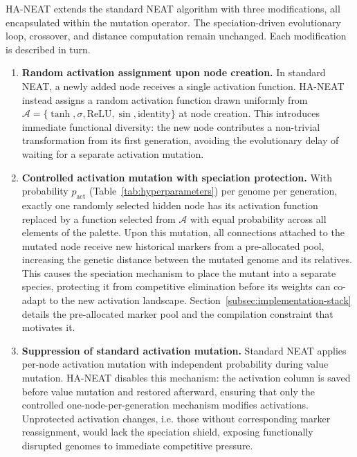\documentclass[12pt]{article}
\begin{document}
HA-NEAT extends the standard NEAT algorithm with three modifications, all encapsulated within the mutation operator.
The speciation-driven evolutionary loop, crossover, and distance computation remain unchanged.
Each modification is described in turn.

\begin{enumerate}
    \item \textbf{Random activation assignment upon node creation.} In standard NEAT, a newly added node receives a single activation function. HA-NEAT instead assigns a random activation function drawn uniformly from $\mathcal{A} = \{\tanh, \sigma, \text{ReLU}, \sin, \text{identity}\}$ at node creation. This introduces immediate functional diversity: the new node contributes a non-trivial transformation from its first generation, avoiding the evolutionary delay of waiting for a separate activation mutation.
    
    \item \textbf{Controlled activation mutation with speciation protection.} With probability $p_{\text{act}}$ (Table~\ref{tab:hyperparameters}) per genome per generation, exactly one randomly selected hidden node has its activation function replaced by a function selected from
    $\mathcal{A}$ with equal probability across all elements of the palette. Upon this mutation, all connections attached to the mutated node receive new historical markers from a pre-allocated pool, increasing the genetic distance between the mutated genome and its relatives. This causes the speciation mechanism to place the mutant into a separate species, protecting it from competitive elimination before its weights can co-adapt to the new activation landscape. Section~\ref{subsec:implementation-stack} details the pre-allocated marker pool and the compilation constraint that motivates it.
    
    \item \textbf{Suppression of standard activation mutation.} Standard NEAT applies per-node activation mutation with independent probability during value mutation. HA-NEAT disables this mechanism: the activation column is saved before value mutation and restored afterward, ensuring that only the controlled one-node-per-generation mechanism modifies activations. Unprotected activation changes, i.e. those without corresponding marker reassignment, would lack the speciation shield, exposing functionally disrupted genomes to immediate competitive pressure.
\end{enumerate}
\end{document}
